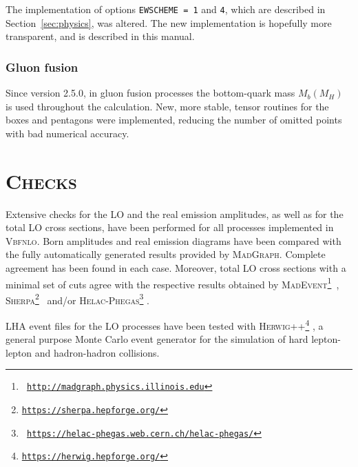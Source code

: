 \documentclass[english,12pt]{article}
\begin{document}
The implementation of options {\tt EWSCHEME = 1} and {\tt 4}, which are
described in Section~\ref{sec:physics}, was altered.  The new
implementation is hopefully more transparent, and is described in this manual. 

\subsubsection{Gluon fusion}

Since version 2.5.0, in gluon fusion processes the bottom-quark
mass $M_{b}(M_{H})$ is used throughout the calculation.  New, more stable,
tensor routines for the boxes and pentagons were implemented, reducing the
number of omitted points with bad numerical accuracy.



\newpage

\section{\textsc{Checks}}

Extensive checks for the LO and the real emission amplitudes, as well as for the
total LO cross sections, have been performed for all processes implemented in
\textsc{Vbfnlo}.  Born amplitudes and real emission diagrams have been compared
with the fully automatically generated results provided by
\textsc{MadGraph}\cite{Stelzer:1994ta}. Complete agreement has been found in
each case.  Moreover, total LO cross sections with a minimal set of cuts agree
with the respective results obtained by \textsc{MadEvent}\footnote{\tt
  \url{http://madgraph.physics.illinois.edu}}~\cite{Maltoni:2002qb,Alwall:2007st},
\textsc{Sherpa}\footnote{\tt \url{https://sherpa.hepforge.org/}}~\cite{Gleisberg:2008ta}
and/or \textsc{Helac-Phegas}\footnote{\tt
\url{https://helac-phegas.web.cern.ch/helac-phegas/}}
\cite{Kanaki:2000ey,Papadopoulos:2005ky,Cafarella:2007pc}. 

LHA event files for the LO processes have been tested with
\textsc{Herwig++}\footnote{\tt \url{https://herwig.hepforge.org/}}
\cite{Bahr:2008pv},  a general purpose Monte Carlo event generator for the
simulation of hard lepton-lepton and hadron-hadron collisions.
\end{document}
